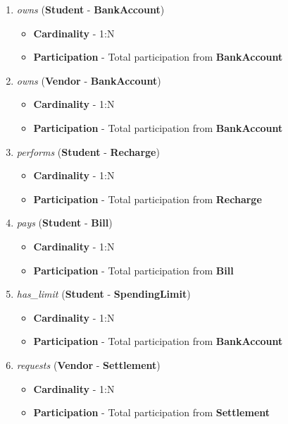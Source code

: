 \documentclass[a4paper,12pt]{article}
\begin{document}
\begin{enumerate}
    \item \textit{owns} (\textbf{Student} - \textbf{BankAccount})
    \begin{itemize}
        \item \textbf{Cardinality} - 1:N 
        \item \textbf{Participation} - Total participation from \textbf{BankAccount}
    \end{itemize}

    \item \textit{owns} (\textbf{Vendor} - \textbf{BankAccount})
    \begin{itemize}
        \item \textbf{Cardinality} - 1:N
        \item \textbf{Participation} - Total participation from \textbf{BankAccount}
    \end{itemize}

    \item \textit{performs} (\textbf{Student} - \textbf{Recharge})
    \begin{itemize}
        \item \textbf{Cardinality} - 1:N
        \item \textbf{Participation} - Total participation from \textbf{Recharge}
    \end{itemize}

    \item \textit{pays} (\textbf{Student} - \textbf{Bill})
    \begin{itemize}
        \item \textbf{Cardinality} - 1:N
        \item \textbf{Participation} -  Total participation from \textbf{Bill}
    \end{itemize}

    \item \textit{has\_limit} (\textbf{Student} - \textbf{SpendingLimit})
    \begin{itemize}
        \item \textbf{Cardinality} - 1:N
        \item \textbf{Participation} - Total participation from \textbf{BankAccount}
    \end{itemize}

    \item \textit{requests} (\textbf{Vendor} - \textbf{Settlement})
    \begin{itemize}
        \item \textbf{Cardinality} - 1:N
        \item \textbf{Participation} -  Total participation from \textbf{Settlement}
    \end{itemize}


\end{enumerate}
\end{document}
